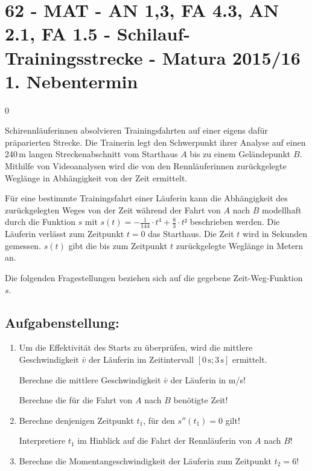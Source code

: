 \section{62 - MAT - AN 1,3, FA 4.3, AN 2.1, FA 1.5 - Schilauf-Trainingsstrecke - Matura 2015/16 1. Nebentermin}

\begin{langesbeispiel} \item[0] %
	
Schirennläuferinnen absolvieren Trainingsfahrten auf einer eigens dafür präparierten Strecke. Die Trainerin legt den Schwerpunkt ihrer Analyse auf einen 240\,m langen Streckenabschnitt vom Starthaus $A$ bis zu einem Geländepunkt $B$. Mithilfe von Videoanalysen wird die von den Rennläuferinnen zurückgelegte Weglänge in Abhängigkeit von der Zeit ermittelt.

Für eine bestimmte Trainingsfahrt einer Läuferin kann die Abhängigkeit des zurückgelegten  Weges von der Zeit während der Fahrt von $A$ nach $B$ modellhaft durch die Funktion $s$ mit $s(t)=-\frac{1}{144}\cdot t^4+\frac{8}{3}\cdot t²$ beschrieben werden. Die Läuferin verlässt zum Zeitpunkt $t=0$ das Starthaus. Die Zeit $t$ wird in Sekunden gemessen. $s(t)$ gibt die bis zum Zeitpunkt $t$ zurückgelegte Weglänge in Metern an.

Die folgenden Fragestellungen beziehen sich auf die gegebene Zeit-Weg-Funktion $s$.


\subsection{Aufgabenstellung:}
\begin{enumerate}
	\item Um die Effektivität des Starts zu überprüfen, wird die mittlere Geschwindigkeit $\bar{v}$ der Läuferin im Zeitintervall $[0\,\text{s};3\,\text{s}]$ ermittelt.
	
	Berechne die mittlere Geschwindigkeit $\bar{v}$ der Läuferin in m/s!
	
	Berechne die für die Fahrt von $A$ nach $B$ benötigte Zeit!
	
	\item {} Berechne denjenigen Zeitpunkt $t_1$, für den $s''(t_1)=0$ gilt!
			
			Interpretiere $t_1$ im Hinblick auf die Fahrt der Rennläuferin von $A$ nach $B$!
			
	\item Berechne die Momentangeschwindigkeit der Läuferin zum Zeitpunkt $t_2=6$!
	

\end{enumerate}
\end{langesbeispiel}
